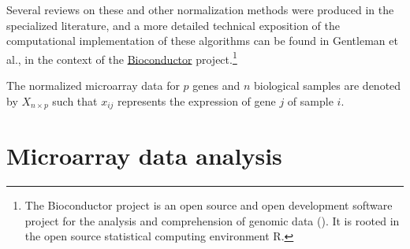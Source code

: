 


Several reviews on these and other normalization methods were produced in the
specialized
literature,\cite{ploner_correlation_2005,bolstad_comparison_2003,harr_comparison_2006}
and a more detailed technical exposition of the computational implementation of
these algorithms can be found in Gentleman et
al.,\cite{gentleman_bioinformatics_2006} in the context of the
\href{http://www.bioconductor.org/}{\textsf{Bioconductor}} project.\footnote{The
  Bioconductor project is an open source and open development software project
  for the analysis and comprehension of genomic data
  (\citealp{gentleman_bioconductor:_2004}).  It is rooted in the open source
  statistical computing environment \textsf{R}.}

\medskip

The normalized microarray data for $p$ genes and $n$ biological samples are
denoted by $X_{n \times p}$ such that $x_{ij}$ represents the expression of gene
$j$ of sample $i$.

\section{Microarray data analysis}
\label{sec:microarray-methods-data-analysis}

